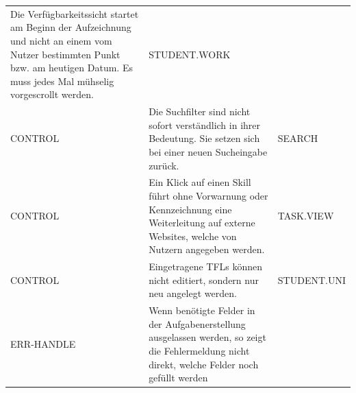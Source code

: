 \documentclass[
  12pt,
  ngerman,
  a4paper,
]{article}
\begin{document}
\begin{longtable}[]{@{}lll@{}}
\begin{minipage}[t]{0.52\columnwidth}
Die Verfügbarkeitssicht startet am Beginn der Aufzeichnung und nicht an
einem vom Nutzer bestimmten Punkt bzw. am heutigen Datum. Es muss jedes
Mal mühselig vorgescrollt werden.\strut
\end{minipage} & \begin{minipage}[t]{0.17\columnwidth}\raggedright
STUDENT.WORK\strut
\end{minipage}\tabularnewline
\begin{minipage}[t]{0.22\columnwidth}\raggedright
CONTROL\strut
\end{minipage} & \begin{minipage}[t]{0.52\columnwidth}\raggedright
Die Suchfilter sind nicht sofort verständlich in ihrer Bedeutung. Sie
setzen sich bei einer neuen Sucheingabe zurück.\strut
\end{minipage} & \begin{minipage}[t]{0.17\columnwidth}\raggedright
SEARCH\strut
\end{minipage}\tabularnewline
\begin{minipage}[t]{0.22\columnwidth}\raggedright
CONTROL\strut
\end{minipage} & \begin{minipage}[t]{0.52\columnwidth}\raggedright
Ein Klick auf einen Skill führt ohne Vorwarnung oder Kennzeichnung eine
Weiterleitung auf externe Websites, welche von Nutzern angegeben
werden.\strut
\end{minipage} & \begin{minipage}[t]{0.17\columnwidth}\raggedright
TASK.VIEW\strut
\end{minipage}\tabularnewline
\begin{minipage}[t]{0.22\columnwidth}\raggedright
CONTROL\strut
\end{minipage} & \begin{minipage}[t]{0.52\columnwidth}\raggedright
Eingetragene TFLs können nicht editiert, sondern nur neu angelegt
werden.\strut
\end{minipage} & \begin{minipage}[t]{0.17\columnwidth}\raggedright
STUDENT.UNI\strut
\end{minipage}\tabularnewline
\begin{minipage}[t]{0.22\columnwidth}\raggedright
ERR-HANDLE\strut
\end{minipage} & \begin{minipage}[t]{0.52\columnwidth}\raggedright
Wenn benötigte Felder in der Aufgabenerstellung ausgelassen werden, so
zeigt die Fehlermeldung nicht direkt, welche Felder noch gefüllt werden

\end{minipage}
\end{longtable}
\end{document}
